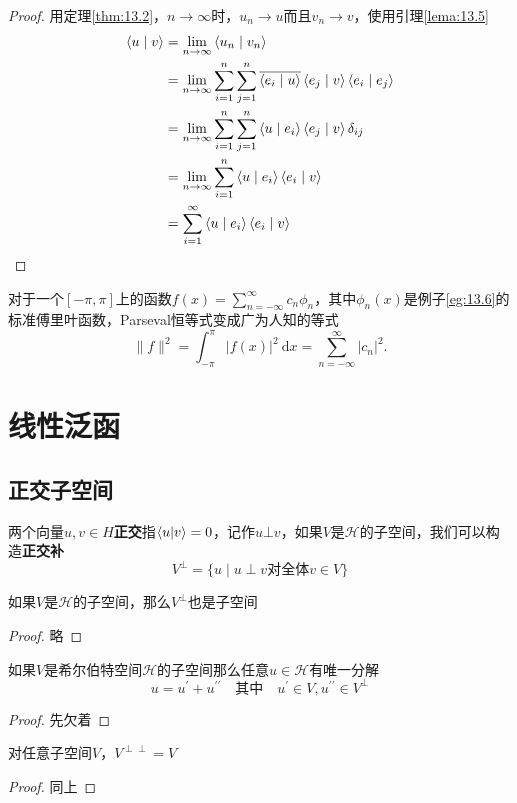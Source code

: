 \begin{proof}
    用定理\ref{thm:13.2}，\(n\rightarrow \infty\)时，\(u_n\rightarrow u\)而且\(v_n\rightarrow v\)，使用引理\ref{lema:13.5}
    $$
\begin{aligned}
\langle u \mid v\rangle &=\lim _{n \rightarrow \infty}\left\langle u_{n} \mid v_{n}\right\rangle \\
&=\lim _{n \rightarrow \infty} \sum_{i=1}^{n} \sum_{j=1}^{n} \overline{\left\langle e_{i} \mid u\right\rangle}\left\langle e_{j} \mid v\right\rangle\left\langle e_{i} \mid e_{j}\right\rangle \\
&=\lim _{n \rightarrow \infty} \sum_{i=1}^{n} \sum_{j=1}^{n}\left\langle u \mid e_{i}\right\rangle\left\langle e_{j} \mid v\right\rangle \delta_{i j} \\
&=\lim _{n \rightarrow \infty} \sum_{i=1}^{n}\left\langle u \mid e_{i}\right\rangle\left\langle e_{i} \mid v\right\rangle \\
&=\sum_{i=1}^{\infty}\left\langle u \mid e_{i}\right\rangle\left\langle e_{i} \mid v\right\rangle \qedhere
\end{aligned}
$$
\end{proof}
对于一个\([-\pi,\pi]\)上的函数\(f(x)=\sum^{\infty}_{n=-\infty}c_n\phi_n\)，其中\(\phi_n (x)\)是例子\ref{eg:13.6}的标准傅里叶函数，Parseval恒等式变成广为人知的等式
$$
\|f\|^{2}=\int_{-\pi}^{\pi}|f(x)|^{2} \mathrm{~d} x=\sum_{n=-\infty}^{\infty}\left|c_{n}\right|^{2} .
$$
\section{线性泛函}
\subsection{正交子空间}
两个向量\(u,v\in H\)\textbf{正交}指\(\braket{u|v}=0\)，记作\(u\bot v\)，如果\(V\)是\(\mathcal{H}\)的子空间，我们可以构造\textbf{正交补}
$$
V^{\bot}=\{u \mid u \perp v \text {对全体} v \in V\}
$$
\begin{theorem}
    如果\(V\)是\(\mathcal{H}\)的子空间，那么\(V^{\perp}\)也是子空间
\end{theorem}
\begin{proof}
    略
\end{proof}
\begin{theorem}\label{thm:13.8}
    如果\(V\)是希尔伯特空间\(\mathcal{H}\)的子空间那么任意\(u\in\mathcal{H}\)有唯一分解
    $$
u=u^{\prime}+u^{\prime \prime} \quad \text {其中} \quad u^{\prime} \in V, u^{\prime \prime} \in V^{\perp} 
$$
\end{theorem}
\begin{proof}
    先欠着
\end{proof}
\begin{corollary}
    对任意子空间\(V\)，\(V^{\perp \perp}=V\)
\end{corollary}
\begin{proof}
    同上
\end{proof}
